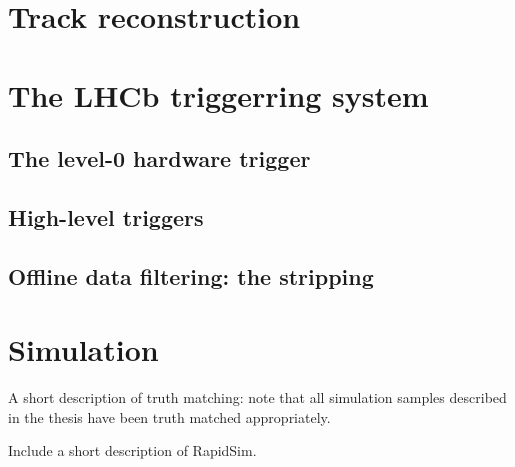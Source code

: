 


\section{Track reconstruction} %
\label{sec:reconstruction}


\section{The LHCb triggerring system} %
\label{sec:the_lhcb_triggerring_system}


\subsection{The level-0 hardware trigger} %
\label{sub:the_level_0_hardware_trigger}


\subsection{High-level triggers} %
\label{sub:high_level_triggers}


\subsection{Offline data filtering: the \lhcb stripping} %
\label{sub:offline_data_filtering_the_lhcb_stripping}





\section{Simulation} %
\label{sec:simulation}

A short description of truth matching: note that all simulation samples described in the thesis have been truth matched appropriately.

Include a short description of RapidSim.

